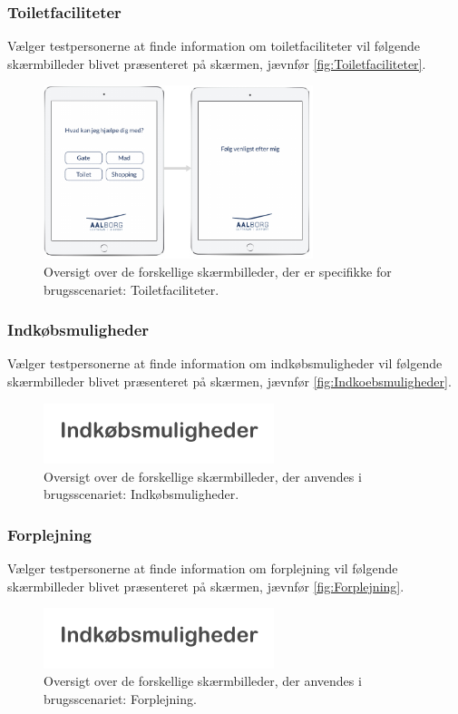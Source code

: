 \subsubsection*{Toiletfaciliteter}
%
Vælger testpersonerne at finde information om toiletfaciliteter vil følgende skærmbilleder blivet præsenteret på skærmen, jævnfør \autoref{fig:Toiletfaciliteter}. 
%
\begin{figure}[H]
\centering
\includegraphics[width = 0.7\textwidth]{Figure/Toiletfaciliteter} 
\caption{Oversigt over de forskellige skærmbilleder, der er specifikke for brugsscenariet: Toiletfaciliteter.}
\label{fig:Toiletfaciliteter}
\end{figure}
\noindent
%  
\subsubsection*{Indkøbsmuligheder}
%
Vælger testpersonerne at finde information om indkøbsmuligheder vil følgende skærmbilleder blivet præsenteret på skærmen, jævnfør \autoref{fig:Indkoebsmuligheder}. 
%
\begin{figure}[H]
\centering
\includegraphics[width = 0.6\textwidth]{Figure/Indkoebsmuligheder} 
\caption{Oversigt over de forskellige skærmbilleder, der anvendes i brugsscenariet: Indkøbsmuligheder.}
\label{fig:Indkoebsmuligheder}
\end{figure}
\noindent
% 
\subsubsection*{Forplejning}
%
Vælger testpersonerne at finde information om forplejning vil følgende skærmbilleder blivet præsenteret på skærmen, jævnfør \autoref{fig:Forplejning}. 
%
\begin{figure}[H]
\centering
\includegraphics[width = 0.6\textwidth]{Figure/Indkoebsmuligheder} 
\caption{Oversigt over de forskellige skærmbilleder, der anvendes i brugsscenariet: Forplejning.}
\label{fig:Forplejning}
\end{figure}
\noindent
% 
